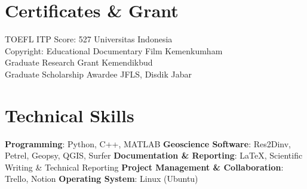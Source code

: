 \documentclass[11pt,a4paper]{article}
\begin{document}
\vspace{0.3em}

\section*{Certificates \& Grant}
\noindent
TOEFL ITP Score: 527 \hfill Universitas Indonesia \\
Copyright: Educational Documentary Film \hfill Kemenkumham \\
Graduate Research Grant \hfill Kemendikbud \\
Graduate Scholarship Awardee \hfill JFLS, Disdik Jabar 

\vspace{0.3em}

\section*{Technical Skills}
\noindent
\textbf{Programming}: Python, C++, MATLAB \hspace{1em}
\textbf{Geoscience Software}: Res2Dinv, Petrel, Geopsy, QGIS, Surfer \hspace{1em}
\textbf{Documentation \& Reporting}: LaTeX, Scientific Writing \& Technical Reporting \hspace{1em}
\textbf{Project Management \& Collaboration}: Trello, Notion \hspace{1em}
\textbf{Operating System}: Linux (Ubuntu)
\end{document}
